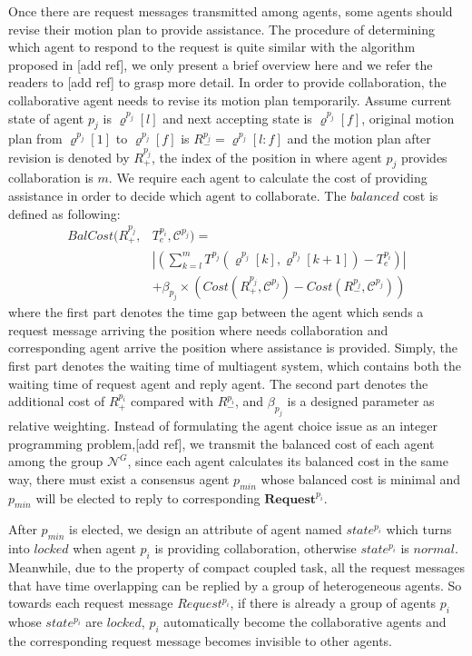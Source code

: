 \documentclass[journal]{IEEEtran}
\begin{document}
Once there are request messages transmitted among agents, some agents should revise their motion plan to provide assistance. The procedure of determining which agent to respond to the request is quite similar with the algorithm proposed in [add ref], we only present a brief overview here and we refer the readers to [add ref] to grasp more detail. In order to provide collaboration, the collaborative agent needs to revise its motion plan temporarily. Assume current state of agent $p_j$ is $\varrho^{p_j}[l]$ and next accepting state is $\varrho^{p_j}[f]$, original motion plan from $\varrho^{p_j}[1]$ to $\varrho^{p_j}[f]$ is $R^{p_j}_-=\varrho^{p_j}[l:f]$ and the motion plan after revision is denoted by $R^{p_j}_+$, the index of the position in where agent $p_j$ provides collaboration is $m$. We require each agent to calculate the cost of providing assistance in order to decide which agent to collaborate. The $balanced$ cost is defined as following:
\[ \begin{split}
BalCost(R^{p_j}_+,&T^{p_i}_e,\mathcal{C}^{p_j})=\\
&|(\sum_{k=l}^{m}T^{p_j}(\varrho^{p_j}[k],\varrho^{p_j}[k+1])-T^{p_i}_e)|\\
&+\beta_{p_j} \times (Cost(R^{p_j}_+,\mathcal{C}^{p_j})-Cost(R^{p_j}_-,\mathcal{C}^{p_j}))
\end{split} \]
where the first part denotes the time gap between the agent which sends a request message arriving the position where needs collaboration and corresponding agent arrive the position where assistance is provided. Simply, the first part denotes the waiting time of multiagent system, which contains both the waiting time of request agent and reply agent. The second part denotes the additional cost of $R^{p_i}_+$ compared with $R^{p_i}_-$, and $\beta_{p_j}$ is a designed parameter as relative weighting. Instead of formulating the agent choice issue as an integer programming problem,[add ref], we transmit the balanced cost of each agent among the group $\mathcal{N}^{G}$, since each agent calculates its balanced cost in the same way, there must exist a consensus agent $p_{min}$ whose balanced cost is minimal and $p_{min}$ will be elected to reply to corresponding $\textbf{Request}^{p_i}$.\par
After $p_{min}$ is elected, we design an attribute of agent named $state^{p_i}$ which turns into $locked$ when agent $p_i$ is providing collaboration, otherwise $state^{p_i}$ is $normal$. Meanwhile, due to the property of compact coupled task, all the request messages that have time overlapping can be replied by a group of heterogeneous agents. So towards each request message $Request^{p_i}$, if there is already a group of agents ${p_i}$ whose $state^{p_i}$ are $locked$, ${p_i}$ automatically become the collaborative agents and the corresponding request message becomes invisible to other agents.\par
\end{document}
